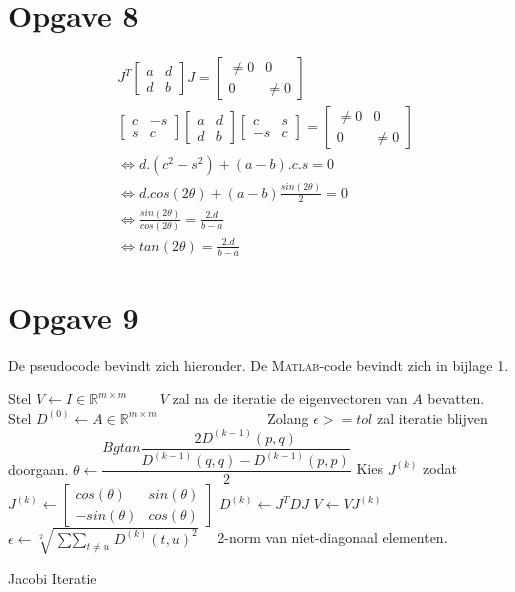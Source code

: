 \documentclass[a4paper]{article}
\newcommand{\opgave}[1]{\section*{Opgave #1}}
\begin{document}
\opgave{8}
\begin{algorithmic}
\State
\begin{align*}
&J^{T}
\begin{bmatrix} 
a & d \\
d & b 
\end{bmatrix}
J
=
\begin{bmatrix} 
\neq 0 & 0 \\
0 & \neq 0
\end{bmatrix}\\
&\begin{bmatrix} 
c & -s \\
s & c
\end{bmatrix}
\begin{bmatrix} 
a & d \\
d & b 
\end{bmatrix}
\begin{bmatrix} 
c & s \\
-s & c 
\end{bmatrix}
=
\begin{bmatrix} 
\neq 0 & 0 \\
0 & \neq 0
\end{bmatrix}\\
&\Leftrightarrow d.(c^2-s^2)+(a-b).c.s = 0 \\
 &\Leftrightarrow d. cos(2\theta)+(a-b) \frac{sin(2\theta)}{2}= 0\\
 &\Leftrightarrow \frac{sin(2\theta)}{cos(2\theta)} = \frac{2.d}{b-a}\\
 &\Leftrightarrow tan(2\theta) = \frac{2.d}{b-a}
\end{align*}

\end{algorithmic}
\opgave{9}
De pseudocode bevindt zich hieronder. De \textsc{Matlab}-code bevindt zich in bijlage 1.
\begin{algorithm}
 
\begin{algorithmic}[1]
\State Stel $V \leftarrow I \in \mathbb{R}^{m\times m}$ \ \ \ \ {$V$ zal na de iteratie de eigenvectoren van $A$ bevatten.}
\State Stel $D^{(0)} \leftarrow A \in \mathbb{R}^{m\times m}$
 \ \ \ \ \ \ \ \ \ \ \ \ \ \ \ {Zolang $\epsilon >= tol$ zal iteratie blijven doorgaan.}
\State $\theta \leftarrow \dfrac{Bgtan\dfrac{2D^{(k-1)}(p,q)}{D^{(k-1)}(q,q)-D^{(k-1)}(p,p)}}{2}$
\State Kies $J^{(k)}$ zodat
\State $J^{(k)} \leftarrow \begin{bmatrix} 
cos(\theta) & sin(\theta) \\
-sin(\theta) & cos(\theta)
\end{bmatrix}$
\State $D^{(k)} \leftarrow J^{T}DJ$
\State $V \leftarrow V J^{(k)}$
\State $\epsilon \leftarrow \sqrt[2]{\mathop{\sum\sum}_{t\neq u} D^{(k)}(t,u)^2}$ \ \ {2-norm van niet-diagonaal elementen.}
\EndFor
\EndFor
\EndFor
\end{algorithmic}
\caption{Jacobi Iteratie}
\label{alg:alg2}
\end{algorithm}
\end{document}
